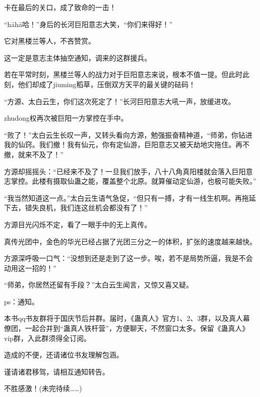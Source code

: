 \begin{this_body}
卡在最后的关口，成了致命的一击！

“hāhā哈！”身后的长河巨阳意志大笑，“你们来得好！”

它对黑楼兰等人，不吝赞赏。

这一定是意志主体抽空通知，调来的这群援兵。

若在平常时刻，黑楼兰等人的战力对于巨阳意志来说，根本不值一提。但此时此刻，他们却成了jiuming稻草，压倒双方天平的最关键的砝码！

“方源、太白云生，你们这次死定了！”长河巨阳意志大吼一声，放缓进攻。

zhudong权再次被巨阳一方掌控在手中。

“败了！”太白云生长叹一声，又转头看向方源，勉强振奋精神道，“师弟，你钻进我的仙窍。我们撤！我有仙元，你有定仙游，巨阳意志又被天劫地灾拖住。再不撤，就来不及了！”

方源却摇摇头：“已经来不及了！一旦我们放手，八十八角真阳楼就会落入巨阳意志掌控。此楼有摄取仙蛊之能，覆盖整个北原。就算催动定仙游，也极可能失败。”

“我当然知道这一点。”太白云生语气急促，“但只有一搏，才有一线生机啊。再拖延下去，错失良机，我们连这丝机会都没有了！”

方源目光闪烁不定，看了一眼手中的无上真传。

真传光团中，金色的华光已经占据了光团三分之一的体积，扩张的速度越来越快。

方源深呼吸一口气：“没想到还是走到了这一步。唉，若不是局势所逼，我是不会动用这一招的！”

“师弟，你居然还留有手段？”太白云生闻言，又惊又喜又疑。

ps：通知。

本书qq书友群将于国庆节后并群。届时，《蛊真人》官方1、2、3群，以及真人幕僚团，一起合并到“蛊真人铁杆营”，方便聊天，不然窗口太多。保留《蛊真人》vip群，入此群须得全订阅。

造成的不便，还请诸位书友理解包涵。

谨请诸君移驾，请相互通知转告。

不胜感激！(未完待续……)

\end{this_body}

